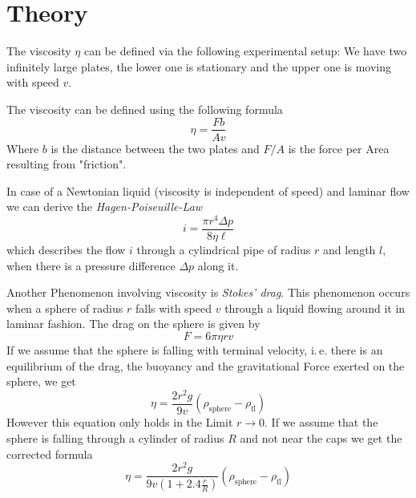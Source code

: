 \section{Theory}

The viscosity $\eta$ can be defined via the following experimental setup: We have two infinitely large plates, the lower one is stationary and the upper one is moving with speed $v$.

The viscosity can be defined using the following formula
\[
    \eta = \frac{F b}{A v} \label{eq:vis}
\]
Where $b$ is the distance between the two plates and $F/A$ is the force per Area resulting from "friction".

In case of a Newtonian liquid (viscosity is independent of speed) and laminar flow  we can derive the \emph{Hagen-Poiseuille-Law} 
\[
    i = \frac{\pi r^4 \Delta p}{8 \eta \ell} \label{eq:hp}
\]
which describes the flow $i$ through a cylindrical pipe of radius $r$ and length $l$, when there is a pressure difference $\Delta p$ along it.

Another Phenomenon involving viscosity is \emph{Stokes' drag}. This phenomenon occurs when a sphere of radius $r$ falls with speed $v$ through a liquid flowing around it in laminar fashion. The drag on the sphere is given by
\[
    F = 6 \pi \eta r v \label{eq:stokes}
\]
If we assume that the sphere is falling with terminal velocity, i.\,e. there is an equilibrium of the drag, the buoyancy and the gravitational Force exerted on the sphere, we get
\[
    \eta = \frac{2 r^2 g}{9 v}(\rho_\mathrm{sphere} - \rho_\mathrm{fl}) \label{eq:termid}
\]
However this equation only holds in the Limit $r \to 0$. 
If we assume that the sphere is falling through a cylinder of radius $R$ and not near the caps we get the corrected formula
\[
    \eta = \frac{2 r^2 g}{9 v \left( 1 + 2.4 \frac{r}{R} \right)}(\rho_\mathrm{sphere} - \rho_\mathrm{fl}) \label{eq:term}
\]




